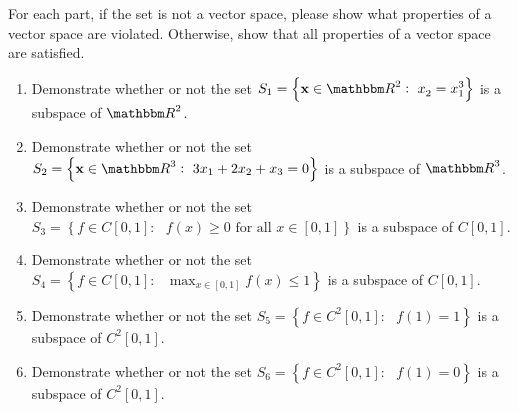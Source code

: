 For each part, if the set is not a vector space, please show what properties of a vector space are violated.  Otherwise, show that all properties of a vector space are satisfied.  
\begin{enumerate}
\item Demonstrate whether or not the set $\displaystyle{S_1=\left\{\Bx \in \R^2 :\mbox{ }x_2^{} = x_1^3\right\}}$ is a subspace of $\R^2$.
\\
\item Demonstrate whether or not the set $\displaystyle{S_2=\left\{\Bx \in \R^3 :\mbox{ }3x_1 + 2x_2 + x_3 = 0\right\}}$ is a subspace of $\R^3$.
\\
\item Demonstrate whether or not the set $\displaystyle{S_3=\left\{f \in C[0,1]:\mbox{ }f(x) \ge 0\mbox{ for all }x\in [0,1]\right\}}$ is a subspace of $C[0,1]$.
\\
\item Demonstrate whether or not the set $\displaystyle{S_4=\left\{f \in C[0,1]:\mbox{ }\max_{x\in[0,1]} f(x) \le 1\right\}}$ is a subspace of $C[0,1]$.
\\
\item Demonstrate whether or not the set $\displaystyle{S_5=\left\{f \in C^2[0,1]:\mbox{ }f(1) = 1\right\}}$ is a subspace of $C^2[0,1]$.
\\
\item Demonstrate whether or not the set $\displaystyle{S_6=\left\{f \in C^2[0,1]:\mbox{ }f(1) = 0\right\}}$ is a subspace of $C^2[0,1]$.
\end{enumerate}





